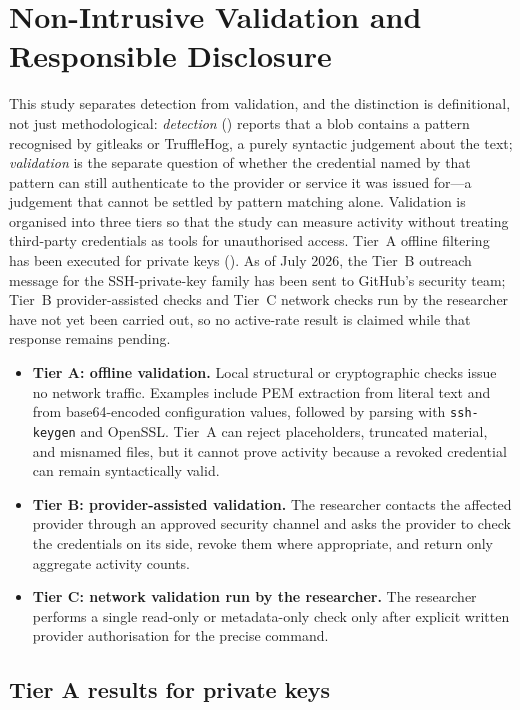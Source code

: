\section{Non-Intrusive Validation and Responsible Disclosure}
\label{sec:sec-validation}

This study separates detection from validation, and the distinction is definitional, not just methodological: \emph{detection} () reports that a blob contains a pattern recognised by gitleaks or TruffleHog, a purely syntactic judgement about the text; \emph{validation} is the separate question of whether the credential named by that pattern can still authenticate to the provider or service it was issued for---a judgement that cannot be settled by pattern matching alone.
Validation is organised into three tiers so that the study can measure activity without treating third-party credentials as tools for unauthorised access.
Tier~A offline filtering has been executed for private keys ().
As of July 2026, the Tier~B outreach message for the SSH-private-key family has been sent to GitHub's security team; Tier~B provider-assisted checks and Tier~C network checks run by the researcher have not yet been carried out, so no active-rate result is claimed while that response remains pending.

\begin{itemize}
\item \textbf{Tier A: offline validation.} Local structural or cryptographic checks issue no network traffic.
Examples include PEM extraction from literal text and from base64-encoded configuration values, followed by parsing with \texttt{ssh-keygen} and OpenSSL.
Tier~A can reject placeholders, truncated material, and misnamed files, but it cannot prove activity because a revoked credential can remain syntactically valid.
\item \textbf{Tier B: provider-assisted validation.} The researcher contacts the affected provider through an approved security channel and asks the provider to check the credentials on its side, revoke them where appropriate, and return only aggregate activity counts.
\item \textbf{Tier C: network validation run by the researcher.} The researcher performs a single read-only or metadata-only check only after explicit written provider authorisation for the precise command.
\end{itemize}

\subsection{Tier A results for private keys}
\label{sec:sec-pk-tier-a}

